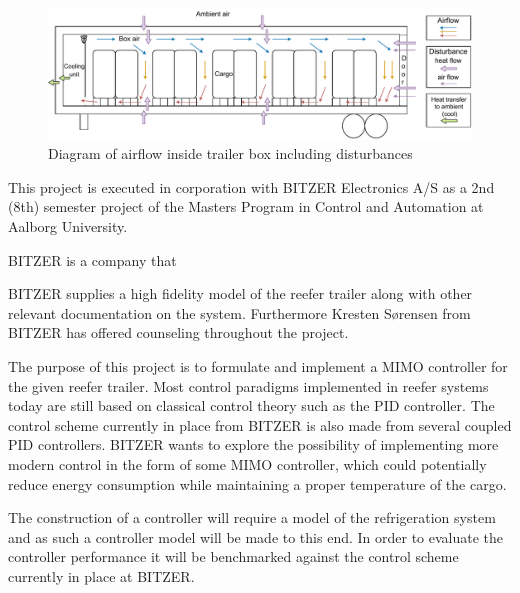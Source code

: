 \begin{figure}[h]
	\centering
	\includegraphics[width = 0.8\linewidth]{Graphics/Trailer_airflow.pdf}
	\caption{Diagram of airflow inside trailer box including disturbances}
	\label{fig:trailer_airflow}
\end{figure}

This project is executed in corporation with BITZER Electronics A/S as a 2nd (8th) semester project of the Masters Program in Control and Automation at Aalborg University.


BITZER is a company that 


BITZER supplies a high fidelity model of the reefer trailer along with other relevant documentation on the system. Furthermore Kresten Sørensen from BITZER has offered counseling throughout the project.

The purpose of this project is to formulate and implement a MIMO controller for the given reefer trailer. Most control paradigms implemented in reefer systems today are still based on classical control theory such as the PID controller. The control scheme currently in place from BITZER is also made from several coupled PID controllers. BITZER wants to explore the possibility of implementing more modern control in the form of some MIMO controller, which could potentially reduce energy consumption while maintaining a proper temperature of the cargo.

The construction of a controller will require a model of the refrigeration system and as such a controller model will be made to this end. In order to evaluate the controller performance it will be benchmarked against the control scheme currently in place at BITZER.